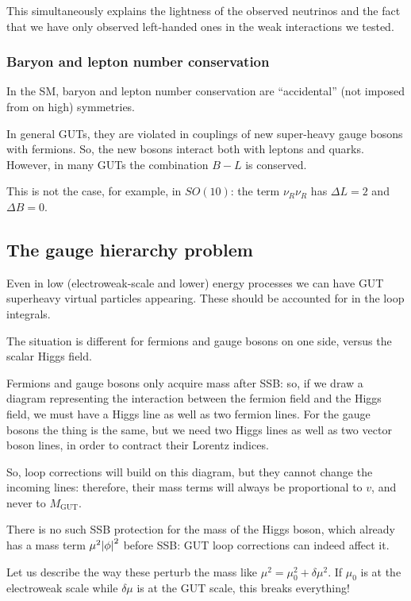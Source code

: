 \documentclass[main.tex]{subfiles}
\begin{document}
This simultaneously explains the lightness of the observed neutrinos and  the fact that we have only observed left-handed ones in the weak interactions we tested. 

\subsubsection{Baryon and lepton number conservation}

In the SM, baryon and lepton number conservation are ``accidental'' (not imposed from on high) symmetries.  

In general GUTs, they are violated in couplings of new super-heavy gauge bosons with fermions.
So, the new bosons interact both with leptons and quarks. 
However, in many GUTs the combination \(B - L\) is conserved. 

This is not the case, for example, in \(SO(10)\): the term \(\nu_{R} \nu_{R} \) has \(\Delta L = 2\) and \(\Delta B = 0\). 

\subsection{The gauge hierarchy problem}

Even in low (electroweak-scale and lower) energy processes we can have GUT superheavy virtual particles appearing. These should be accounted for in the loop integrals. 

The situation is different for fermions and gauge bosons on one side, versus the scalar Higgs field. 

Fermions and gauge bosons only acquire mass after SSB: so, if we draw a diagram representing the interaction between the fermion field and the Higgs field, we must have a Higgs line as well as two fermion lines. For the gauge bosons the thing is the same, but we need two Higgs lines as well as two vector boson lines, in order to contract their Lorentz indices. 

So, loop corrections will build on this diagram, but they cannot change the incoming lines:
therefore, their mass terms will always be proportional to \(v\), and never to \(M _{\text{GUT}}\). 

There is no such SSB protection for the mass of the Higgs boson, which already has a mass term \(\mu^2 \abs{\phi}^2\) before SSB: GUT loop corrections can indeed affect it. 

Let us describe the way these perturb the mass like \(\mu^2 = \mu_0^2 + \delta \mu^2\). If \(\mu_0\) is at the electroweak scale while \(\delta \mu\) is at the GUT scale, this breaks everything!
\end{document}

